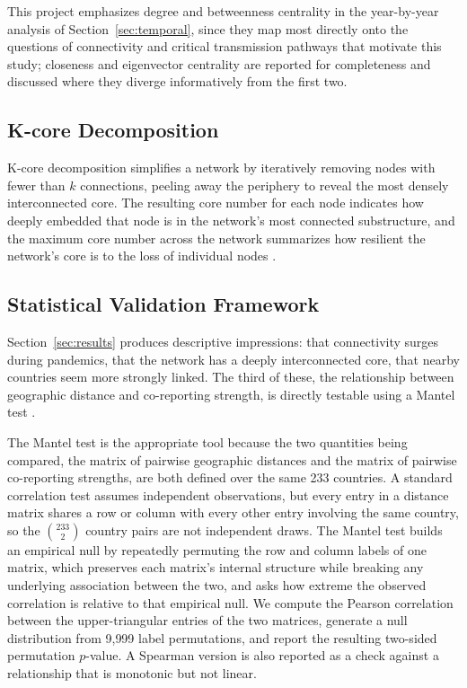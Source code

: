 \documentclass[11pt]{article}
\begin{document}
This project emphasizes degree and betweenness centrality in the year-by-year analysis of
Section~\ref{sec:temporal}, since they map most directly onto the questions of connectivity
and critical transmission pathways that motivate this study; closeness and eigenvector
centrality are reported for completeness and discussed where they diverge informatively
from the first two.

\subsection{K-core Decomposition}

K-core decomposition simplifies a network by iteratively removing nodes with fewer than $k$
connections, peeling away the periphery to reveal the most densely interconnected core. The
resulting core number for each node indicates how deeply embedded that node is in the
network's most connected substructure, and the maximum core number across the network
summarizes how resilient the network's core is to the loss of individual nodes
\cite{montresor2012}.

\subsection{Statistical Validation Framework}

Section~\ref{sec:results} produces descriptive impressions: that connectivity surges during
pandemics, that the network has a deeply interconnected core, that nearby countries seem
more strongly linked. The third of these, the relationship between geographic distance and
co-reporting strength, is directly testable using a Mantel test \cite{mantel1967}.

The Mantel test is the appropriate tool because the two quantities being compared, the
matrix of pairwise geographic distances and the matrix of pairwise co-reporting strengths,
are both defined over the same 233 countries. A standard correlation test assumes
independent observations, but every entry in a distance matrix shares a row or column with
every other entry involving the same country, so the $\binom{233}{2}$ country pairs are not
independent draws. The Mantel test builds an empirical null by repeatedly permuting the row
and column labels of one matrix, which preserves each matrix's internal structure while
breaking any underlying association between the two, and asks how extreme the observed
correlation is relative to that empirical null. We compute the Pearson correlation between
the upper-triangular entries of the two matrices, generate a null distribution from 9{,}999
label permutations, and report the resulting two-sided permutation $p$-value. A Spearman
version is also reported as a check against a relationship that is monotonic but not
linear.
\end{document}
